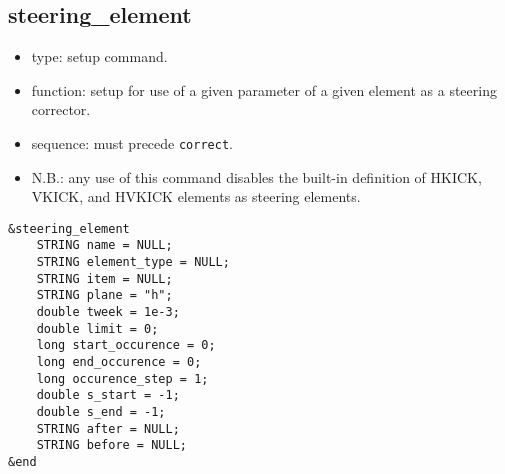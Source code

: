 \documentclass[11pt]{article}
\begin{document}
\subsection{steering\_element \label{subsec:steeringelement}}

\begin{itemize}
\item type: setup command.
\item function: setup for use of a given parameter of a given element as a steering corrector.
\item sequence: must precede \verb|correct|.
\item N.B.: any use of this command disables the built-in definition of HKICK, VKICK, and HVKICK elements
  as steering elements.
\end{itemize}

\begin{verbatim}
&steering_element
    STRING name = NULL;
    STRING element_type = NULL;
    STRING item = NULL;
    STRING plane = "h";
    double tweek = 1e-3;
    double limit = 0;
    long start_occurence = 0;
    long end_occurence = 0;
    long occurence_step = 1;
    double s_start = -1;
    double s_end = -1;
    STRING after = NULL;
    STRING before = NULL;
&end
\end{verbatim}
\end{document}

